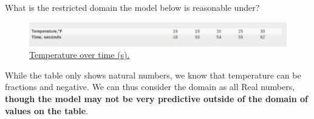 \documentclass{ximera}
\begin{document}
\begin{question}
What is the restricted domain the model below is reasonable under?
\begin{figure}
\includegraphics[scale=0.4]{temperature.png}
\caption{\href{https://cnx.org/contents/mwjClAV_@8.12:6dX4RGdg@12/Fitting-Linear-Models-to-Data}{Temperature over time (s).}}
\end{figure}

\begin{multipleChoice}
\end{multipleChoice}

\begin{feedback}[correct]
While the table only shows natural numbers, we know that temperature can be fractions and negative. We can thus consider the domain as all Real numbers, \textbf{though the model may not be very predictive outside of the domain of values on the table}.
\end{feedback}


\end{question}
\end{document}
